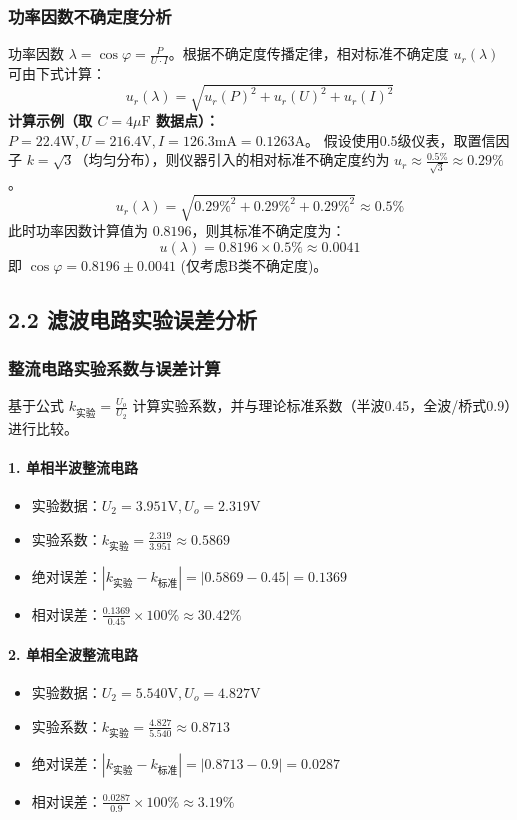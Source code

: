 \documentclass[]{../template/Report}%
\begin{document}
\begin{fullreportonly}
    \subsubsection{功率因数不确定度分析}
    功率因数 $\lambda = \cos\varphi = \frac{P}{U \cdot I}$。根据不确定度传播定律，相对标准不确定度 $u_r(\lambda)$ 可由下式计算：
    $$ u_r(\lambda) = \sqrt{u_r(P)^2 + u_r(U)^2 + u_r(I)^2} $$
    \textbf{计算示例（取 $C=4\mu\text{F}$ 数据点）：}
    $P=22.4\text{W}, U=216.4\text{V}, I=126.3\text{mA}=0.1263\text{A}$。
    假设使用0.5级仪表，取置信因子 $k=\sqrt{3}$（均匀分布），则仪器引入的相对标准不确定度约为 $u_r \approx \frac{0.5\%}{\sqrt{3}} \approx 0.29\%$。
    $$ u_r(\lambda) = \sqrt{0.29\%^2 + 0.29\%^2 + 0.29\%^2} \approx 0.5\% $$
    此时功率因数计算值为 $0.8196$，则其标准不确定度为：
    $$ u(\lambda) = 0.8196 \times 0.5\% \approx 0.0041 $$
    即 $\cos\varphi = 0.8196 \pm 0.0041$ (仅考虑B类不确定度)。

    \subsection{2.2 滤波电路实验误差分析}

    \subsubsection{整流电路实验系数与误差计算}
    基于公式 $k_{\text{实验}} = \frac{U_o}{U_2}$ 计算实验系数，并与理论标准系数（半波0.45，全波/桥式0.9）进行比较。

    \paragraph{1. 单相半波整流电路}
    \begin{itemize}
        \item 实验数据：$U_2 = 3.951\text{V}, U_o = 2.319\text{V}$
        \item 实验系数：$k_{\text{实验}} = \frac{2.319}{3.951} \approx 0.5869$
        \item 绝对误差：$|k_{\text{实验}} - k_{\text{标准}}| = |0.5869 - 0.45| = 0.1369$
        \item 相对误差：$\frac{0.1369}{0.45} \times 100\% \approx 30.42\%$
    \end{itemize}

    \paragraph{2. 单相全波整流电路}
    \begin{itemize}
        \item 实验数据：$U_2 = 5.540\text{V}, U_o = 4.827\text{V}$
        \item 实验系数：$k_{\text{实验}} = \frac{4.827}{5.540} \approx 0.8713$
        \item 绝对误差：$|k_{\text{实验}} - k_{\text{标准}}| = |0.8713 - 0.9| = 0.0287$
        \item 相对误差：$\frac{0.0287}{0.9} \times 100\% \approx 3.19\%$
    \end{itemize}


\end{fullreportonly}
\end{document}
